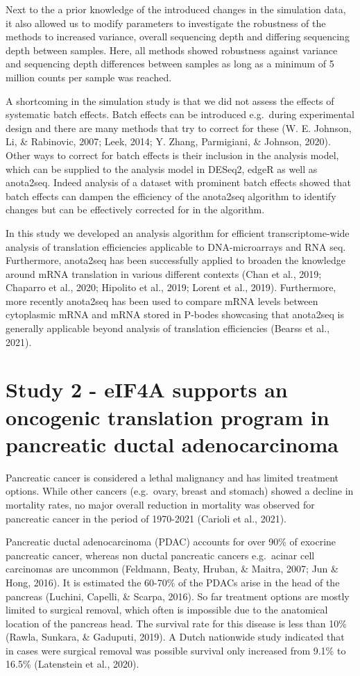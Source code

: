 \documentclass[12pt,openany]{book}
\begin{document}
Next to the a prior knowledge of the introduced changes in the
simulation data, it also allowed us to modify parameters to investigate
the robustness of the methods to increased variance, overall sequencing
depth and differing sequencing depth between samples. Here, all methods
showed robustness against variance and sequencing depth differences
between samples as long as a minimum of 5 million counts per sample was
reached.

A shortcoming in the simulation study is that we did not assess the
effects of systematic batch effects. Batch effects can be introduced
e.g.~during experimental design and there are many methods that try to
correct for these (W. E. Johnson, Li, \& Rabinovic, 2007; Leek, 2014; Y.
Zhang, Parmigiani, \& Johnson, 2020). Other ways to correct for batch
effects is their inclusion in the analysis model, which can be supplied
to the analysis model in DESeq2, edgeR as well as anota2seq. Indeed
analysis of a dataset with prominent batch effects showed that batch
effects can dampen the efficiency of the anota2seq algorithm to identify
changes but can be effectively corrected for in the algorithm.

In this study we developed an analysis algorithm for efficient
transcriptome-wide analysis of translation efficiencies applicable to
DNA-microarrays and RNA seq. Furthermore, anota2seq has been
successfully applied to broaden the knowledge around mRNA translation in
various different contexts (Chan et al., 2019; Chaparro et al., 2020;
Hipolito et al., 2019; Lorent et al., 2019). Furthermore, more recently
anota2seq has been used to compare mRNA levels between cytoplasmic mRNA
and mRNA stored in P-bodes showcasing that anota2seq is generally
applicable beyond analysis of translation efficiencies (Bearss et al.,
2021). \newline
\section{Study 2 - eIF4A supports an oncogenic translation program in pancreatic ductal adenocarcinoma}

Pancreatic cancer is considered a lethal malignancy and has limited
treatment options. While other cancers (e.g.~ovary, breast and stomach)
showed a decline in mortality rates, no major overall reduction in
mortality was observed for pancreatic cancer in the period of 1970-2021
(Carioli et al., 2021).

Pancreatic ductal adenocarcinoma (PDAC) accounts for over 90\% of
exocrine pancreatic cancer, whereas non ductal pancreatic cancers
e.g.~acinar cell carcinomas are uncommon (Feldmann, Beaty, Hruban, \&
Maitra, 2007; Jun \& Hong, 2016). It is estimated the 60-70\% of the
PDACs arise in the head of the pancreas (Luchini, Capelli, \& Scarpa,
2016). So far treatment options are mostly limited to surgical removal,
which often is impossible due to the anatomical location of the pancreas
head. The survival rate for this disease is less than 10\% (Rawla,
Sunkara, \& Gaduputi, 2019). A Dutch nationwide study indicated that in
cases were surgical removal was possible survival only increased from
9.1\% to 16.5\% (Latenstein et al., 2020).
\end{document}
